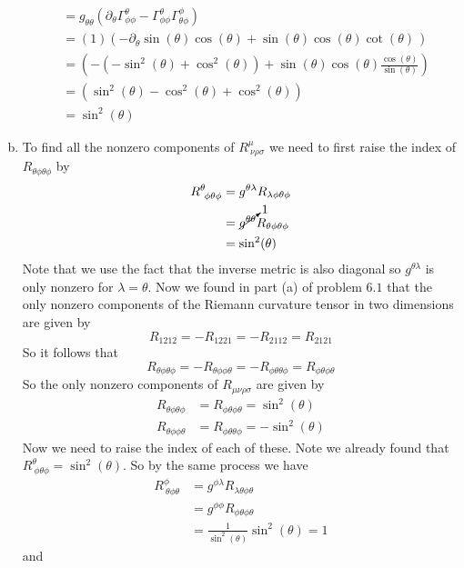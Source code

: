 \documentclass[11pt]{article}
\numberwithin{equation}{section}
\newcommand{\HWnum}{6}
\begin{document}
\begin{enumerate}[(a)]
\begin{align*}
&=  g_{\theta\theta}\left(\partial_{\theta}\Gamma^{\theta}_{\phi\phi} - \Gamma^{\theta}_{\phi\phi}\Gamma^{\phi}_{\theta\phi}\right)\\
&=  (1)\left(-\partial_{\theta}\sin(\theta)\cos(\theta) + \sin(\theta)\cos(\theta)\cot(\theta)\frac{}{}\right)\\
&=  \left(-\left(-\sin^2(\theta) + \cos^2(\theta)\right) + \sin(\theta)\cos(\theta)\frac{\cos(\theta)}{\sin(\theta)}\right)\\
&=  \left(\sin^2(\theta) - \cos^2(\theta) + \cos^2(\theta)\right)\\
&=  \sin^2(\theta)
\end{align*}


\item
To find all the nonzero components of $R^{\mu}_{\ \nu\rho\sigma}$ we need to first raise the index of $R_{\theta\phi\theta\phi}$ by
\begin{align*}
R^{\theta}_{\ \phi\theta\phi} &= g^{\theta\lambda}R_{\lambda\phi\theta\phi}\\
&= \cancelto{1}{g^{\theta\theta}}R_{\theta\phi\theta\phi}\\
&= \sin^2(\theta)
\end{align*}
Note that we use the fact that the inverse metric is also diagonal so $g^{\theta\lambda}$ is only nonzero for $\lambda = \theta$. Now we found in part (a) of problem $\HWnum.1$ that the only nonzero components of the Riemann curvature tensor in two dimensions are given by
$$R_{1212} = - R_{1221} = -R_{2112} = R_{2121}$$
So it follows that 
$$R_{\theta\phi\theta\phi} = - R_{\theta\phi\phi\theta} = -R_{\phi\theta\theta\phi} = R_{\phi\theta\phi\theta}$$
So the only nonzero components of $R_{\mu\nu\rho\sigma}$ are given by
\begin{align*}
R_{\theta\phi\theta\phi} &=  R_{\phi\theta\phi\theta} = \sin^2(\theta)\\
R_{\theta\phi\phi\theta} &= R_{\phi\theta\theta\phi} = -\sin^2(\theta)
\end{align*}
Now we need to raise the index of each of these. Note we already found that $R^{\theta}_{\ \phi\theta\phi} = \sin^2(\theta)$. So by the same process we have
\begin{align*}
R^{\phi}_{\ \theta\phi\theta} &= g^{\phi\lambda}R_{\lambda\theta\phi\theta}\\
&= g^{\phi\phi}R_{\phi\theta\phi\theta}\\
&= \frac{1}{\sin^2(\theta)}\sin^2(\theta) = 1
\end{align*}
and
\begin{align*}

\end{align*}
\end{enumerate}
\end{document}
